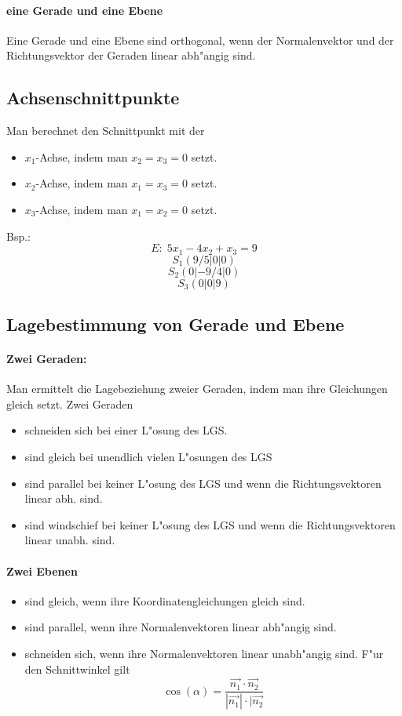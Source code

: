 \documentclass[a4paper]{article}
\begin{document}
\paragraph{eine Gerade und eine Ebene}
Eine Gerade und eine Ebene sind orthogonal, wenn der Normalenvektor und der Richtungsvektor der Geraden linear abh"angig sind.

\subsection{Achsenschnittpunkte}
Man berechnet den Schnittpunkt mit der
\begin{itemize}
\item $x_1$-Achse, indem man $x_2 = x_3 = 0$ setzt.
\item $x_2$-Achse, indem man $x_1 = x_3 = 0$ setzt.
\item $x_3$-Achse, indem man $x_1 = x_2 = 0$ setzt.
\end{itemize}

Bsp.:
$$E:\; 5x_1 - 4x_2 +x_3 =9$$
$$S_1 (9/5|0|0)$$
$$S_2 (0|-9/4|0)$$
$$S_3 (0|0|9)$$

\subsection{Lagebestimmung von Gerade und Ebene}
\paragraph{Zwei Geraden: }
Man ermittelt die Lagebeziehung zweier Geraden, indem man ihre Gleichungen gleich setzt. Zwei Geraden
\begin{itemize}
\item schneiden sich bei einer L"osung des LGS.
\item sind gleich bei unendlich vielen L"osungen des LGS
\item sind parallel bei keiner L"osung des LGS und wenn die Richtungsvektoren linear abh. sind.
\item sind windschief bei keiner L"osung des LGS und wenn die Richtungsvektoren linear unabh. sind.
\end{itemize}

\paragraph{Zwei Ebenen}
\begin{itemize}
\item sind gleich, wenn ihre Koordinatengleichungen gleich sind.
\item sind parallel, wenn ihre Normalenvektoren linear abh"angig sind.\
\item schneiden sich, wenn ihre Normalenvektoren linear unabh"angig sind. F"ur den Schnittwinkel gilt $$\cos(\alpha) = \frac{\vec{n_1} \cdot \vec{n_2}}{|\vec{n_1}| \cdot |\vec{n_2}}$$
\end{itemize}
\end{document}
